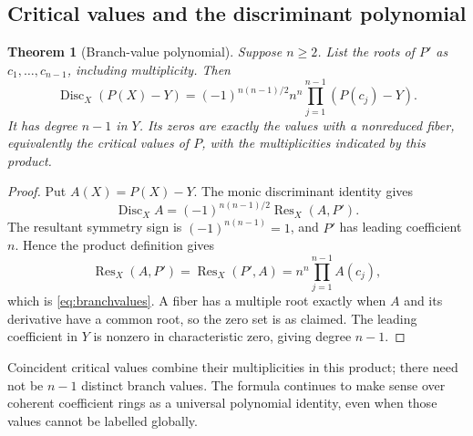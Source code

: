 \documentclass[11pt,letterpaper]{article}
\numberwithin{equation}{section}
\newtheorem{theorem}{Theorem}[section]
\theoremstyle{definition}
\theoremstyle{remark}
\newcommand{\Res}{\operatorname{Res}}
\newcommand{\Disc}{\operatorname{Disc}}
\begin{document}
\subsection{Critical values and the discriminant polynomial}
\begin{theorem}[Branch-value polynomial]\label{thm:branchvalues}
Suppose $n\ge2$. List the roots of $P'$ as $c_1,\ldots,c_{n-1}$,
including multiplicity. Then
\begin{equation}\label{eq:branchvalues}
 \Disc_X(P(X)-Y)
 =(-1)^{n(n-1)/2}n^n\prod_{j=1}^{n-1}(P(c_j)-Y).
\end{equation}
It has degree $n-1$ in $Y$. Its zeros are exactly the values with a
nonreduced fiber, equivalently the critical values of $P$, with the
multiplicities indicated by this product.
\end{theorem}
\begin{proof}
Put $A(X)=P(X)-Y$. The monic discriminant identity gives
\[
 \Disc_X A=(-1)^{n(n-1)/2}\Res_X(A,P').
\]
The resultant symmetry sign is $(-1)^{n(n-1)}=1$, and $P'$ has leading
coefficient $n$. Hence the product definition gives
\[
 \Res_X(A,P')=\Res_X(P',A)=n^n\prod_{j=1}^{n-1}A(c_j),
\]
which is \eqref{eq:branchvalues}. A fiber has a multiple root exactly when
$A$ and its derivative have a common root, so the zero set is as claimed.
The leading coefficient in $Y$ is nonzero in characteristic zero, giving
degree $n-1$.
\end{proof}

Coincident critical values combine their multiplicities in this product;
there need not be $n-1$ distinct branch values. The formula continues to
make sense over coherent coefficient rings as a universal polynomial
identity, even when those values cannot be labelled globally.
\end{document}
